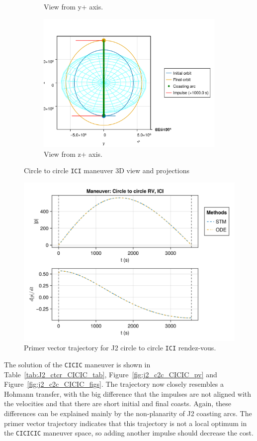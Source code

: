 \begin{figure}[htbp]
\begin{subfigure}{0.49\linewidth}
        \caption{View from y+ axis.}
    \end{subfigure}
    \begin{subfigure}{0.49\linewidth}
        \includegraphics[width=0.8\linewidth]{../results/j2/hohmann/ICI_z+.png}
        \caption{View from z+ axis.}
    \end{subfigure}
    \caption{Circle to circle \texttt{ICI} maneuver 3D view and projections}
    \label{fig:j2_c2c_ICI_figs}
\end{figure}

\begin{figure}[htbp]
    \centering
    \includegraphics[width=0.7\linewidth]{../results/j2/hohmann/ICI_primer_vector.png}
    \caption{Primer vector trajectory for J2 circle to circle \texttt{ICI} rendez-vous.}
    \label{fig:j2_c2c_ICI_pv}
\end{figure}
\FloatBarrier
The solution of the \texttt{CICIC} maneuver is shown in Table~\ref{tab:J2_ctcr_CICIC_tab}, Figure~\ref{fig:j2_c2c_CICIC_pv} and Figure~\ref{fig:j2_c2c_CICIC_figs}. The trajectory now closely resembles a Hohmann transfer, with the big difference that the impulses are not aligned with the velocities and that there are short initial and final coasts. Again, these differences can be explained mainly by the non-planarity of J2 coasting arcs. The primer vector trajectory indicates that this trajectory is not a local optimum in the \texttt{CICICIC} maneuver space, so adding another impulse should decrease the cost.

